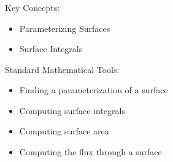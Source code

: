 %
% 

\begin{frame}
\frametitle{\Large {\color[rgb]{0.02,0.20,1.0} }}
\scriptsize

\begin{block}{Key Concepts:}
\begin{itemize}
	\item[...] Parameterizing Surfaces
	\item[...] Surface Integrals
\end{itemize}
\end{block}

\vspace{1.2cm}

\begin{block}{Standard Mathematical Tools:}
\begin{itemize}
	\item[...] Finding a parameterization of a surface
	\item[...] Computing surface integrals
	\item[...] Computing surface area
	\item[...] Computing the flux through a surface
\end{itemize}
\end{block}

\end{frame}

